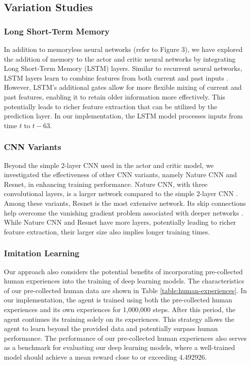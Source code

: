 \documentclass{article}
\begin{document}
\subsection{Variation Studies}
\subsubsection{Long Short-Term Memory}
In addition to memoryless neural networks (refer to Figure 3), we have explored the addition of memory to the actor and critic neural networks by integrating Long Short-Term Memory (LSTM) layers. Similar to recurrent neural networks, LSTM layers learn to combine features from both current and past inputs \cite{hochreiter1997lstm}. However, LSTM's additional gates allow for more flexible mixing of current and past features, enabling it to retain older information more effectively. This potentially leads to richer feature extraction that can be utilized by the prediction layer. In our implementation, the LSTM model processes inputs from time \( t \) to \( t-63 \).

\subsubsection{CNN Variants}
Beyond the simple 2-layer CNN used in the actor and critic model, we investigated the effectiveness of other CNN variants, namely Nature CNN and Resnet, in enhancing training performance. Nature CNN, with three convolutional layers, is a larger network compared to the simple 2-layer CNN \cite{mnih2015humanlevel}. Among these variants, Resnet is the most extensive network. Its skip connections help overcome the vanishing gradient problem associated with deeper networks \cite{he2016deepresidual}. While Nature CNN and Resnet have more layers, potentially leading to richer feature extraction, their larger size also implies longer training times.

\subsubsection{Imitation Learning}
Our approach also considers the potential benefits of incorporating pre-collected human experiences into the training of deep learning models. The characteristics of our pre-collected human data are shown in Table \ref{table:human-experiences}. In our implementation, the agent is trained using both the pre-collected human experiences and its own experiences for 1,000,000 steps. After this period, the agent continues its training solely on its experiences. This strategy allows the agent to learn beyond the provided data and potentially surpass human performance. The performance of our pre-collected human experiences also serves as a benchmark for evaluating our deep learning models, where a well-trained model should achieve a mean reward close to or exceeding 4.492926.
\end{document}
